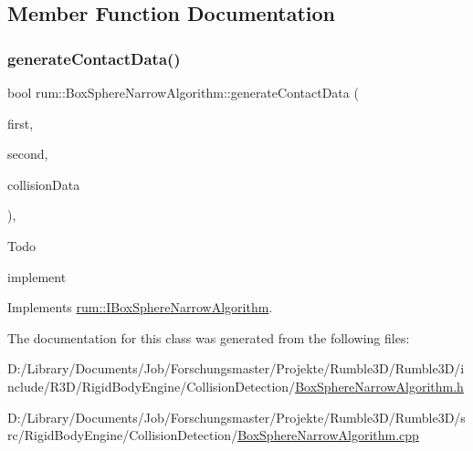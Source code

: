 \subsection{Member Function Documentation}
\mbox{\label{classrum_1_1_box_sphere_narrow_algorithm_aabb8b78607bf604fa7455da4a908c794}} 
\subsubsection{\texorpdfstring{generate\+Contact\+Data()}{generateContactData()}}
{\footnotesize\ttfamily bool rum\+::\+Box\+Sphere\+Narrow\+Algorithm\+::generate\+Contact\+Data (\begin{DoxyParamCaption}\item[{\mbox{\hyperlink{classrum_1_1_collision_box}{Collision\+Box}} $\ast$}]{first,  }\item[{\mbox{\hyperlink{classrum_1_1_collision_sphere}{Collision\+Sphere}} $\ast$}]{second,  }\item[{\mbox{\hyperlink{classrum_1_1_collision_data}{Collision\+Data}} \&}]{collision\+Data }\end{DoxyParamCaption})\hspace{0.3cm}{\ttfamily [override]}, {\ttfamily [virtual]}}

\begin{DoxyRefDesc}{Todo}
\item[\mbox{\hyperlink{todo__todo000003}{Todo}}]implement \end{DoxyRefDesc}


Implements \mbox{\hyperlink{classrum_1_1_i_box_sphere_narrow_algorithm_a4b32bfe38ae668e68b5f6c400cf03e78}{rum\+::\+I\+Box\+Sphere\+Narrow\+Algorithm}}.



The documentation for this class was generated from the following files\+:\begin{DoxyCompactItemize}
\item 
D\+:/\+Library/\+Documents/\+Job/\+Forschungsmaster/\+Projekte/\+Rumble3\+D/\+Rumble3\+D/include/\+R3\+D/\+Rigid\+Body\+Engine/\+Collision\+Detection/\mbox{\hyperlink{_box_sphere_narrow_algorithm_8h}{Box\+Sphere\+Narrow\+Algorithm.\+h}}\item 
D\+:/\+Library/\+Documents/\+Job/\+Forschungsmaster/\+Projekte/\+Rumble3\+D/\+Rumble3\+D/src/\+Rigid\+Body\+Engine/\+Collision\+Detection/\mbox{\hyperlink{_box_sphere_narrow_algorithm_8cpp}{Box\+Sphere\+Narrow\+Algorithm.\+cpp}}\end{DoxyCompactItemize}
